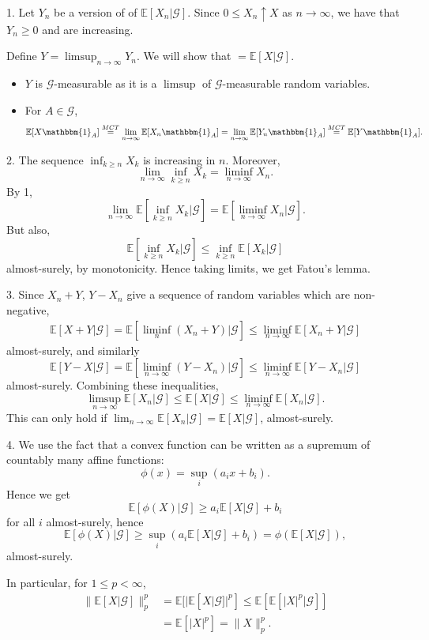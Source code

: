 \documentclass[12pt]{article}
\begin{document}
\begin{proofbox}


	1. Let $Y_n$ be a version of of $\mathbb{E}[X_n | \mathcal{G}]$. Since $0 \leq X_n \uparrow X$ as $n \to \infty$, we have that $Y_n \geq 0$ and are increasing.

	Define $Y = \limsup_{n \to \infty} Y_n$. We will show that $ = \mathbb{E}[X|\mathcal{G}]$.
	\begin{itemize}
		\item $Y$ is $\mathcal{G}$-measurable as it is a $\limsup$ of $\mathcal{G}$-measurable random variables.
		\item For $A \in \mathcal{G}$,
			\[
				\mathbb{E}[ X \mathbbm{1}_{A}] \overset{MCT}= \lim_{n \to \infty} \mathbb{E}[X_n \mathbbm{1}_{A}] = \lim_{n \to \infty} \mathbb{E}[Y_n \mathbbm{1}_{A}] \overset{MCT}= \mathbb{E}[Y \mathbbm{1}_{A}].
			\]
	\end{itemize}
	2. The sequence $\inf_{k \geq n} X_k$ is increasing in $n$. Moreover,
	\[
	\lim_{n \to \infty} \inf_{k \geq n} X_k = \liminf_{n \to \infty} X_n.
	\]
	By 1,
	\[
	\lim_{n \to \infty} \mathbb{E}[ \inf_{ k \geq n} X_k | \mathcal{G}] = \mathbb{E}[ \liminf_{n \to \infty} X_n | \mathcal{G}].
	\]
	But also,
	\[
	\mathbb{E}[\inf_{k \geq n} X_k |\mathcal{G}] \leq \inf_{k \geq n} \mathbb{E}[X_k | \mathcal{G}]
	\]
	almost-surely, by monotonicity. Hence taking limits, we get Fatou's lemma.

	3. Since $X_n + Y$, $Y - X_n$ give a sequence of random variables which are non-negative,
	\begin{align*}
		\mathbb{E}[X + Y | \mathcal{G}] = \mathbb{E}[\liminf_n (X_n + Y) | \mathcal{G}] \leq \liminf_{n \to \infty} \mathbb{E}[X_n + Y | \mathcal{G}]
	\end{align*}
	almost-surely, and similarly
	\[
	\mathbb{E}[Y - X | \mathcal{G}] = \mathbb{E}[ \liminf_{n \to \infty}(Y - X_n) | \mathcal{G}] \leq \liminf_{n \to \infty} \mathbb{E}[Y - X_n | \mathcal{G}]
	\]
	almost-surely. Combining these inequalities,
	\[
	\limsup_{n \to \infty} \mathbb{E}[X_n | \mathcal{G}] \leq \mathbb{E}[X|\mathcal{G}] \leq \liminf_{n \to \infty} \mathbb{E}[X_n | \mathcal{G}].
	\]
	This can only hold if $\lim_{n \to \infty} \mathbb{E}[X_n | \mathcal{G}] = \mathbb{E}[X | \mathcal{G}]$, almost-surely.

	4. We use the fact that a convex function can be written as a supremum of countably many affine functions:
	\[
	\phi(x) = \sup_i (a_i x + b_i).
	\]
	Hence we get
	\[
	\mathbb{E}[\phi(X) | \mathcal{G}] \geq a_i \mathbb{E}[X | \mathcal{G}] + b_i
	\]
	for all $i$ almost-surely, hence
	\[
	\mathbb{E}[\phi(X) | \mathcal{G}] \geq \sup_i (a_i \mathbb{E}[X | \mathcal{G}] + b_i) = \phi(\mathbb{E}[X | \mathcal{G}]),
	\]
	almost-surely.

	In particular, for $1 \leq p < \infty$,
	\begin{align*}
		\|\mathbb{E}[X | \mathcal{G}]\|_p^p &= \mathbb{E}[ | \mathbb{E}[X|\mathcal{G}]|^p] \leq \mathbb{E}[ \mathbb{E}[|X|^p | \mathcal{G}]] \\
						    &= \mathbb{E}[|X|^p] = \|X\|_p^p.
	\end{align*}
\end{proofbox}
\end{document}
